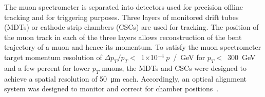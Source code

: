 The muon spectrometer is separated into detectors used for precision offline tracking and for triggering purposes. Three layers of monitored drift tubes (MDTs) or cathode strip chambers (CSCs) are used for tracking. The position of the muon track in each of the three layers allows reconstruction of the bent trajectory of a muon and hence its momentum. To satisfy the muon spectrometer target momentum resolution of $\Delta p_T / p_T <$~1$\times$10$^{-4}~p$~/~GeV for $p_T <$~300~GeV and a few percent for lower $p_T$ muons, the MDTs and CSCs were designed to achieve a spatial resolution of \SI{50}{\micro\meter} each. Accordingly, an optical alignment system was designed to monitor and correct for chamber positions~\cite{atlas_muon_spectrometer_tdr, aefsky_optical_2008}. 


